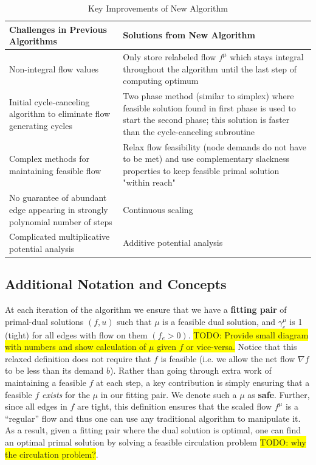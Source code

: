 \documentclass[12pt]{article}
\theoremstyle{definition}
\newcommand{\todo}[1]{\colorbox{yellow}{TODO: #1}}
\begin{document}
\begin{table}[H]
\begin{center}
    \begin{tabular}{ | p{7cm} | p{7cm} |}
    \hline
    Challenges in Previous Algorithms  & Solutions from New Algorithm \\ \hline
    Non-integral flow values & Only store relabeled flow $f^{\mu}$ which stays integral throughout the algorithm until the last step of computing optimum \\ \hline
    Initial cycle-canceling algorithm to eliminate flow generating cycles & Two phase method (similar to simplex) where feasible solution found in first phase is used to start the second phase; this solution is faster than the cycle-canceling subroutine \\ \hline
    Complex methods for maintaining feasible flow & Relax flow feasibility (node demands do not have to be met) and use complementary slackness properties to keep feasible primal solution "within reach" \\ \hline
    No guarantee of abundant edge appearing in strongly polynomial number of steps \cite{Radzik2004} &  Continuous scaling\\ \hline
    Complicated multiplicative potential analysis \cite{Vegh2013} & Additive potential analysis \\
    \hline
    \end{tabular}
\end{center}
\caption{Key Improvements of New Algorithm}
\label{tab:improvements}
\end{table}
    \subsection{Additional Notation and Concepts}
At each iteration of the algorithm we ensure that we have a \textbf{fitting pair} of primal-dual solutions $(f,u)$ such that $\mu$ is a feasible dual solution, and $\gamma_e^{\mu}$ is 1 (tight) for all edges with flow on them $(f_e > 0)$. \todo{Provide small diagram with numbers and show calculation of $\mu$ given $f$ or vice-versa.} Notice that this relaxed definition does not require that $f$ is feasible (i.e. we allow the net flow $\nabla f $ to be less than its demand $b$). Rather than going through extra work of maintaining a feasible $f$ at each step, a key contribution is simply ensuring that a feasible $f$ \textit{exists} for the $\mu$ in our fitting pair. We denote such a $\mu$ as \textbf{safe}. Further, since all edges in $f$ are tight, this definition ensures that the scaled flow $f^{\mu}$ is a ``regular'' flow and thus one can use any traditional algorithm to manipulate it. As a result, given a fitting pair where the dual solution is optimal, one can find an optimal primal solution by solving a feasible circulation problem \todo{why the circulation problem?}. 
\end{document}
